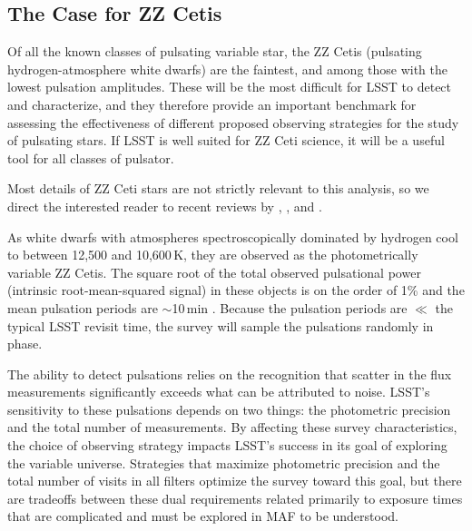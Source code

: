 \subsection{The Case for ZZ Cetis}
\label{sec:\secname:targets}

Of all the known classes of pulsating variable star, the ZZ Cetis
(pulsating hydrogen-atmosphere white dwarfs) are the faintest, and among
those with the lowest pulsation amplitudes.  These will be the most
difficult for LSST to detect and characterize, and they therefore
provide an important benchmark for assessing the effectiveness of
different proposed observing strategies for the study of pulsating
stars.  If LSST is well suited for ZZ Ceti science, it will be a useful
tool for all classes of pulsator.

Most details of ZZ Ceti stars are not strictly relevant to this
analysis, so we direct the interested reader to recent reviews by
\citet{2008ARA&A..46..157W}, \citet{2008PASP..120.1043F}, and
\citet{2010A&ARv..18..471A}.

As white dwarfs with atmospheres spectroscopically dominated by hydrogen
cool to between 12,500 and 10,600\,K, they are observed as the
photometrically variable ZZ Cetis.  The square root of the total
observed pulsational power (intrinsic root-mean-squared signal) in these
objects is on the order of 1\% and the mean pulsation periods are
$\sim$10\,min \citep{2006ApJ...640..956M}.  Because the pulsation
periods are $\ll$ the typical LSST revisit time, the survey will sample
the pulsations randomly in phase.

The ability to detect pulsations relies on the recognition that scatter
in the flux measurements significantly exceeds what can be attributed to
noise.  LSST's sensitivity to these pulsations depends on two things:
the photometric precision and the total number of measurements.  By
affecting these survey characteristics, the choice of observing strategy
impacts LSST's success in its goal of exploring the variable universe.
Strategies that maximize photometric precision and the total number of
visits in all filters optimize the survey toward this goal, but there are
tradeoffs between these dual requirements related primarily to exposure 
times that are complicated and must be explored in MAF to be understood.

